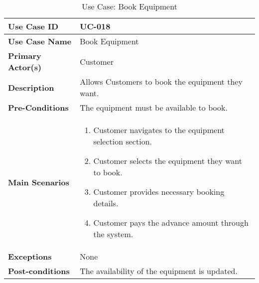 \begin{table}[ht]
    \centering
    \begin{tabular}{|l|p{}|}
        \hline
        \textbf{Use Case ID} & UC-018 \\
        \hline
        \textbf{Use Case Name} & Book Equipment \\
        \hline
        \textbf{Primary Actor(s)} & Customer \\
        \hline
        \textbf{Description} & Allows Customers to book the equipment they want. \\
        \hline
        \textbf{Pre-Conditions} & The equipment must be available to book. \\
        \hline
        \textbf{Main Scenarios} & 
        \begin{enumerate}[label=\arabic*.,itemsep=0pt]
            \item Customer navigates to the equipment selection section.
            \item Customer selects the equipment they want to book.
            \item Customer provides necessary booking details.
            \item Customer pays the advance amount through the system.
        \end{enumerate} \\
        \hline
        \textbf{Exceptions} & None \\
        \hline
        \textbf{Post-conditions} & The availability of the equipment is updated. \\
        \hline
    \end{tabular}
    \label{tab:use-case-book-equipment}
    \caption{Use Case: Book Equipment}
\end{table}


